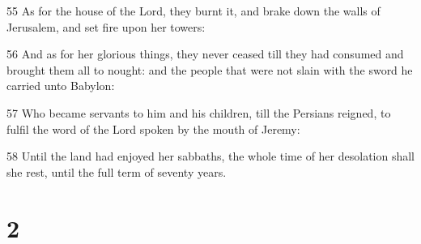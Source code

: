 \par 55 As for the house of the Lord, they burnt it, and brake down the walls of Jerusalem, and set fire upon her towers:
\par 56 And as for her glorious things, they never ceased till they had consumed and brought them all to nought: and the people that were not slain with the sword he carried unto Babylon:
\par 57 Who became servants to him and his children, till the Persians reigned, to fulfil the word of the Lord spoken by the mouth of Jeremy:
\par 58 Until the land had enjoyed her sabbaths, the whole time of her desolation shall she rest, until the full term of seventy years.

\chapter{2}

